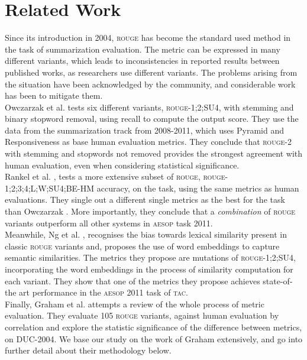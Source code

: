 \documentclass[11pt,a4paper]{article}
\newcommand{\rouge}{\textsc{rouge}\xspace}
\newcommand{\duc}{\textsc{DUC-2004}\xspace}
\begin{document}
\section{Related Work}
\label{sec:related_work}
Since its introduction in 2004, \rouge \cite{Lin_Hovy:2003, Lin:2004} has become the standard 
used method in the task of summarization evaluation. The metric can be expressed in many 
different variants, which leads to inconsistencies in reported results between published 
works, as researchers use different variants. The problems arising from the situation have 
been acknowledged by the community, and considerable work has been to mitigate them.\\ %
Owczarzak et al.  tests six different variants, \rouge-1;2;SU4, with stemming and binary 
stopword removal, using recall to compute the output score. They use the data  from the  
summarization track from 2008-2011, which uses Pyramid and Responsiveness as base human evaluation 
metrics. They conclude that \rouge-2 with stemming and stopwords not removed provides the strongest 
agreement with human evaluation, even when considering statistical significance.\\
Rankel et al. , tests a more extensive subset of \rouge, \rouge-1;2;3;4;L;W;SU4;BE-HM accuracy, 
on the task, using the same metrics as human evaluations. They single out a different single metrics 
as the best for the task than Owczarzak . More importantly, they conclude that a \textit{combination} 
of \rouge variants outperform all other systems in \textsc{aesop} task 2011.\\
Meanwhile, Ng et al. , recognises the bias towards lexical similarity present in classic \rouge 
variants and, proposes the use of word embeddings to capture semantic similarities. The metrics they 
propose are mutations of \rouge-1;2;SU4, incorporating the word embeddings in the process of similarity 
computation for each variant. They show that one of the metrics they propose achieves state-of-the art 
performance in the \textsc{aesop} 2011  task of \textsc{tac}.\\
Finally, Graham et al.  attempts a review of the whole process of metric evaluation. 
They evaluate 105 \rouge variants, against human evaluation by correlation and explore the statistic 
significance of the difference between metrics, on \duc. We base our study on the work of Graham 
extensively, and go into further detail about their methodology below.
\end{document}
